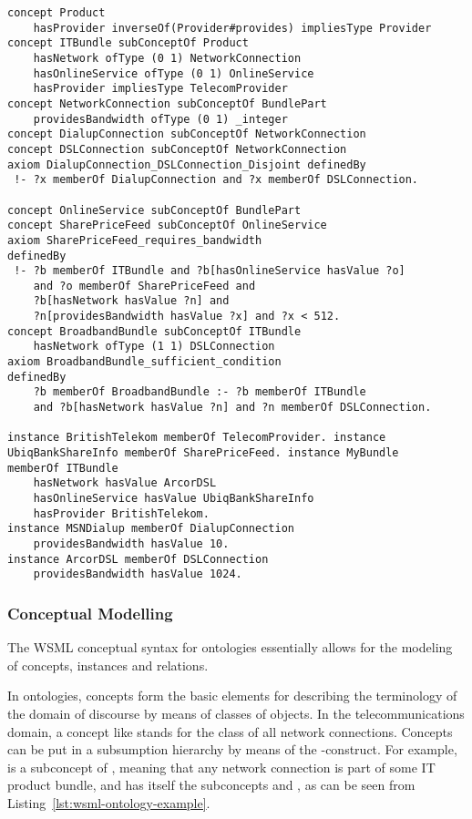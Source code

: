 \begin{lstlisting}[label=lst:wsml-ontology-example,style=wsml, caption=WSML Example Ontology]
concept Product
    hasProvider inverseOf(Provider#provides) impliesType Provider
concept ITBundle subConceptOf Product
    hasNetwork ofType (0 1) NetworkConnection
    hasOnlineService ofType (0 1) OnlineService
    hasProvider impliesType TelecomProvider
concept NetworkConnection subConceptOf BundlePart
    providesBandwidth ofType (0 1) _integer
concept DialupConnection subConceptOf NetworkConnection
concept DSLConnection subConceptOf NetworkConnection
axiom DialupConnection_DSLConnection_Disjoint definedBy
 !- ?x memberOf DialupConnection and ?x memberOf DSLConnection.

concept OnlineService subConceptOf BundlePart
concept SharePriceFeed subConceptOf OnlineService
axiom SharePriceFeed_requires_bandwidth
definedBy
 !- ?b memberOf ITBundle and ?b[hasOnlineService hasValue ?o]
    and ?o memberOf SharePriceFeed and
    ?b[hasNetwork hasValue ?n] and
    ?n[providesBandwidth hasValue ?x] and ?x < 512.
concept BroadbandBundle subConceptOf ITBundle
    hasNetwork ofType (1 1) DSLConnection
axiom BroadbandBundle_sufficient_condition
definedBy
    ?b memberOf BroadbandBundle :- ?b memberOf ITBundle
    and ?b[hasNetwork hasValue ?n] and ?n memberOf DSLConnection.

instance BritishTelekom memberOf TelecomProvider. instance
UbiqBankShareInfo memberOf SharePriceFeed. instance MyBundle
memberOf ITBundle
    hasNetwork hasValue ArcorDSL
    hasOnlineService hasValue UbiqBankShareInfo
    hasProvider BritishTelekom.
instance MSNDialup memberOf DialupConnection
    providesBandwidth hasValue 10.
instance ArcorDSL memberOf DSLConnection
    providesBandwidth hasValue 1024.

\end{lstlisting}

\subsubsection{Conceptual Modelling}
The WSML conceptual syntax for ontologies essentially allows for
the modeling of concepts, instances and relations.

In ontologies, concepts form the basic elements for describing the
terminology of the domain of discourse by means of classes of
objects. In the telecommunications domain, a concept like
 stands for the class of all network
connections. Concepts can be put in a subsumption hierarchy by
means of the -construct. For example,
 is a subconcept of
, meaning that any network connection is part
of some IT product bundle, and has itself the subconcepts
 and , as can be
seen from Listing~\ref{lst:wsml-ontology-example}.

